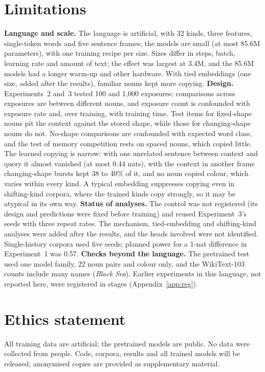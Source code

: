 \documentclass[11pt]{article}
\begin{document}
\section*{Limitations}
\textbf{Language and scale.} The language is artificial, with 32 kinds, three features, single-token words and five sentence frames; the models are small (at most 85.6M parameters), with one training recipe per size. Sizes differ in steps, batch, learning rate and amount of text; the effect was largest at 3.4M, and the 85.6M models had a longer warm-up and other hardware. With tied embeddings (one size, added after the results), familiar nouns kept more copying. \textbf{Design.} Experiments~2 and~3 tested 100 and 1,000 exposures; comparisons across exposures are between different nouns, and exposure count is confounded with exposure rate and, over training, with training time. Test items for fixed-shape nouns pit the context against the stored shape, while those for changing-shape nouns do not. No-shape comparisons are confounded with expected word class, and the test of memory competition rests on spaced nouns, which copied little. The learned copying is narrow: with one unrelated sentence between context and query it almost vanished (at most 0.44 nats), with the context in another frame changing-shape bursts kept 38 to 40\% of it, and no noun copied colour, which varies within every kind. A typical embedding suppresses copying even in shifting-kind corpora, where the trained kinds copy strongly, so it may be atypical in its own way. \textbf{Status of analyses.} The control was not registered (its design and predictions were fixed before training) and reused Experiment~3's seeds with three repeat rates. The mechanism, tied-embedding and shifting-kind analyses were added after the results, and the heads involved were not identified. Single-history corpora used five seeds; planned power for a 1-nat difference in Experiment~1 was 0.57. \textbf{Checks beyond the language.} The pretrained test used one model family, 22 noun pairs and colour only, and the WikiText-103 counts include many names (\emph{Black Sea}). Earlier experiments in this language, not reported here, were registered in stages (Appendix~\ref{app:reg}).

\section*{Ethics statement}
All training data are artificial; the pretrained models are public. No data were collected from people. Code, corpora, results and all trained models will be released; anonymised copies are provided as supplementary material.
\end{document}
